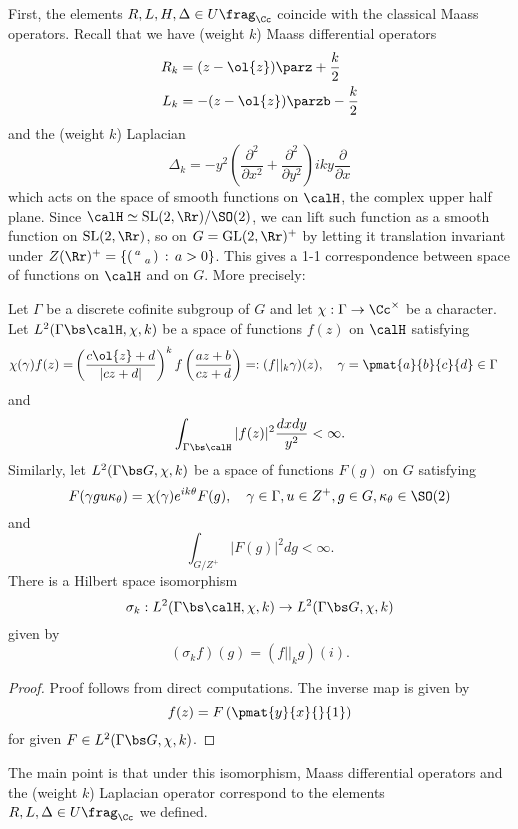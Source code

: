 First, the elements $R, L, H, \Delta \in U\frag_{\Cc}$ coincide with the classical Maass operators.
Recall that we have (weight $k$) Maass differential operators
\begin{align*}
R_{k} &= (z-\ol{z}) \parz + \frac{k}{2} \\
L_{k} &= -(z-\ol{z}) \parzb - \frac{k}{2}
\end{align*}
and the (weight $k$) Laplacian
$$
\Delta_{k} = -y^{2}\left( \frac{\partial^{2}}{\partial x^{2}} + \frac{\partial^{2}}{\partial y^{2}} \right) iky \frac{\partial}{\partial x}
$$
which acts on the space of smooth functions on $\calH$, the complex upper half plane. 
Since $\calH \simeq \SL(2, \Rr) / \SO(2)$, we can lift such function as a smooth function on $\SL(2, \Rr)$, so on $G = \GL(2, \Rr)^{+}$ by letting it translation invariant under $Z(\Rr)^{+} = \{ \smat{a}{}{}{a}\,:\, a>0\}$. 
This gives a 1-1 correspondence between space of functions on $\calH$ and on $G$. More precisely:
\begin{proposition}
Let $\Gamma$ be a discrete cofinite subgroup of $G$ and let $\chi:\Gamma \to \Cc^{\times}$ be a character. 
Let $L^{2}(\Gamma \bs \calH, \chi, k)$ be a space of functions $f(z)$ on $\calH$ satisfying
\begin{align*}
\chi(\gamma)f(z) = &\left(\frac{c\ol{z} + d}{|cz+d|}\right)^{k} f\left( \frac{az+b}{cz+d}\right)=:(f||_{k}\gamma)(z), \quad \gamma = \pmat{a}{b}{c}{d} \in \Gamma 
\end{align*}
and
\begin{align*}
\int_{\Gamma\bs \calH} |f(z)|^{2} \frac{dxdy}{y^{2}} <\infty.
\end{align*}
Similarly, let $L^{2}(\Gamma \bs G, \chi, k)$ be a space of functions $F(g)$ on $G$ satisfying 
$$
F(\gamma g u \kappa_{\theta}) = \chi(\gamma)e^{ik\theta}F(g), \quad \gamma\in \Gamma, u\in Z^{+}, g\in G, \kappa_{\theta}\in \SO(2)
$$
and
$$
\int_{G/Z^{+}} |F(g)|^{2} dg <\infty.
$$
There is a Hilbert space isomorphism 
$$
\sigma_k : L^{2}(\Gamma \bs \calH, \chi, k) \to L^{2}(\Gamma \bs G, \chi, k)
$$
given by 
$$
(\sigma_k f)(g) = (f||_{k}g)(i).
$$
\end{proposition}
\begin{proof}
Proof follows from direct computations. The inverse map is given by 
$$
f(z) = F\left(\pmat{y}{x}{}{1}\right)
$$
for given $F\in L^{2}(\Gamma \bs G, \chi, k)$. 
\end{proof}
The main point is that under this isomorphism, Maass differential operators and the (weight $k$) Laplacian operator correspond to the elements $R, L, \Delta \in U\frag_{\Cc}$ we defined. 
